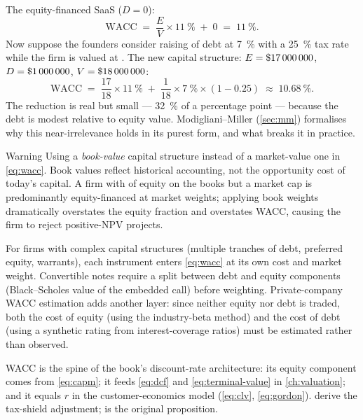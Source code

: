 \begin{example}
The equity-financed SaaS (\(D=0\)):
\[
  \mathrm{WACC} \;=\; \frac{E}{V}\times\qty{11}{\percent} \;+\; 0
               \;=\; \qty{11}{\percent}.
\]
Now suppose the founders consider raising  of debt at \qty{7}{\percent}
with a \qty{25}{\percent} tax rate while the firm is valued at .
The new capital structure: \(E=\$\num{17000000}\), \(D=\$\num{1000000}\),
\(V=\$\num{18000000}\):
\[
  \mathrm{WACC} \;=\; \frac{17}{18}\times\qty{11}{\percent}
               \;+\; \frac{1}{18}\times\qty{7}{\percent}\times(1-0.25)
               \;\approx\; \qty{10.68}{\percent}.
\]
The reduction is real but small --- \qty{32}{\percent} of a percentage point ---
because the debt is modest relative to equity value. Modigliani--Miller
(\cref{sec:mm}) formalises why this near-irrelevance holds in its purest form,
and what breaks it in practice.
\end{example}

\begin{admonition}{Warning}
Using a \emph{book-value} capital structure instead of a market-value one in
\cref{eq:wacc}. Book values reflect historical accounting, not the opportunity
cost of today's capital. A firm with  of equity on the books but
a  market cap is predominantly equity-financed at market weights;
applying book weights dramatically overstates the equity fraction and overstates
WACC, causing the firm to reject positive-NPV projects.
\end{admonition}

For firms with complex capital structures (multiple tranches of debt, preferred equity,
warrants), each instrument enters \cref{eq:wacc} at its own cost and market weight.
Convertible notes require a split between debt and equity components (Black--Scholes value
of the embedded call) before weighting. Private-company WACC estimation adds another layer:
since neither equity nor debt is traded, both the cost of equity (using the industry-beta
method) and the cost of debt (using a synthetic rating from interest-coverage ratios) must
be estimated rather than observed.

WACC is the spine of the book's discount-rate architecture: its equity component comes from
\cref{eq:capm}; it feeds \cref{eq:dcf} and \cref{eq:terminal-value} in \cref{ch:valuation};
and it equals \(r\) in the customer-economics model (\cref{eq:clv}, \cref{eq:gordon}).
\textcite{brealey2020} derive the tax-shield adjustment; \textcite{modigliani1958capital}
is the original proposition.

